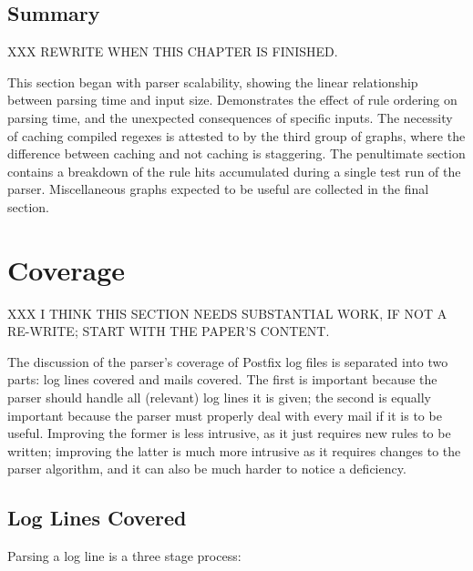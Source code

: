 

\subsection{Summary}

XXX REWRITE WHEN THIS CHAPTER IS FINISHED\@.

This section began with parser scalability, showing the linear relationship
between parsing time and input size.  Demonstrates the effect of rule
ordering on parsing time, and the unexpected consequences of specific
inputs.  The necessity of caching compiled regexes is attested to by the
third group of graphs, where the difference between caching and not caching
is staggering.  The penultimate section contains a breakdown of the rule
hits accumulated during a single test run of the parser.  Miscellaneous
graphs expected to be useful are collected in the final section.

\section{Coverage}

XXX I THINK THIS SECTION NEEDS SUBSTANTIAL WORK, IF NOT A RE-WRITE\@; START
WITH THE PAPER'S CONTENT\@.

\label{parsing coverage}

The discussion of the parser's coverage of Postfix log files is separated
into two parts: log lines covered and mails covered.  The first is
important because the parser should handle all (relevant) log lines it is
given; the second is equally important because the parser must properly
deal with every mail if it is to be useful.  Improving the former is
less intrusive, as it just requires new rules to be written; improving the
latter is much more intrusive as it requires changes to the parser
algorithm, and it can also be much harder to notice a deficiency.

\newpage{} %

\subsection{Log Lines Covered}

\label{log-lines-covered}

Parsing a log line is a three stage process:

